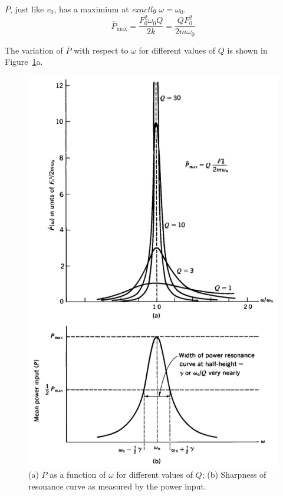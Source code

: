 $\overline{P}$, just like $v_0$, has a maximium at \emph{exactly} $\omega = \omega_0$. 
\begin{equation}
	\overline{P}_\text{max} = \frac{F_0^2\omega_0 Q}{2k} = \frac{QF_0^2}{2m\omega_0}	\label{ch4:eq-P-max}
\end{equation}


The variation of $\overline{P}$ with respect to $\omega$ for different values of $Q$ is shown in Figure~\ref{ch4:fig-P-w-vs-Q}a.

\begin{fullwidth}
	\begin{figure}
		\centering
		\includegraphics[scale=0.6]{phys232/Ch4-P-w-vs-Q.png} \caption{(a) $\overline{P}$ as a function of $\omega$ for different values of $Q$; (b) Sharpness of resonance curve as measured by the power input.}	\label{ch4:fig-P-w-vs-Q}
	\end{figure}
\end{fullwidth}

